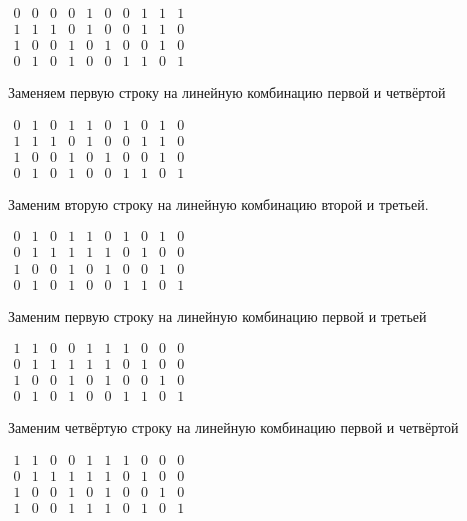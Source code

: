 \documentclass{article}
\begin{document}
	$
	\begin{array}{cccccccccc}
	0 & 0 & 0 & 0 & 1 & 0 & 0 & 1 & 1 & 1\\
	1 & 1 &1 &0 &1 &0 &0 &1 &1 &0\\
	1 & 0 & 0 & 1 & 0 & 1 & 0 & 0 & 1 & 0 \\
	0 & 1 & 0 & 1 & 0 & 0 & 1 & 1 & 0 & 1
	\end{array}
	$
	
	Заменяем первую строку на линейную комбинацию первой и четвёртой
	
	$
	\begin{array}{cccccccccc}
	0 &1& 0& 1& 1& 0& 1& 0& 1& 0\\
	1 & 1 &1 &0 &1 &0 &0 &1 &1 &0\\
	1 & 0 & 0 & 1 & 0 & 1 & 0 & 0 & 1 & 0 \\
	0 & 1 & 0 & 1 & 0 & 0 & 1 & 1 & 0 & 1
	\end{array}
	$
	
	Заменим вторую строку на линейную комбинацию второй и третьей.
	
	$
	\begin{array}{cccccccccc}
	0 &1& 0& 1& 1& 0& 1& 0& 1& 0\\
	0 & 1 & 1 & 1 & 1 & 1 & 0 & 1 & 0 & 0\\
	1 & 0 & 0 & 1 & 0 & 1 & 0 & 0 & 1 & 0 \\
	0 & 1 & 0 & 1 & 0 & 0 & 1 & 1 & 0 & 1
	\end{array}
	$
	
	Заменим первую строку на линейную комбинацию первой и третьей
	
	$
	\begin{array}{cccccccccc}
	1 & 1 & 0& 0 & 1 & 1 & 1 & 0 & 0 & 0\\
	0 & 1 & 1 & 1 & 1 & 1 & 0 & 1 & 0 & 0\\
	1 & 0 & 0 & 1 & 0 & 1 & 0 & 0 & 1 & 0 \\
	0 & 1 & 0 & 1 & 0 & 0 & 1 & 1 & 0 & 1
	\end{array}
	$
	
	Заменим четвёртую строку на линейную комбинацию первой и четвёртой
	
	$
	\begin{array}{cccccccccc}
	1 & 1 & 0& 0 & 1 & 1 & 1 & 0 & 0 & 0\\
	0 & 1 & 1 & 1 & 1 & 1 & 0 & 1 & 0 & 0\\
	1 & 0 & 0 & 1 & 0 & 1 & 0 & 0 & 1 & 0 \\
	1 &0 &0 &1 &1 &1 &0 &1 &0 &1
	\end{array}
	$
	
\end{document}
